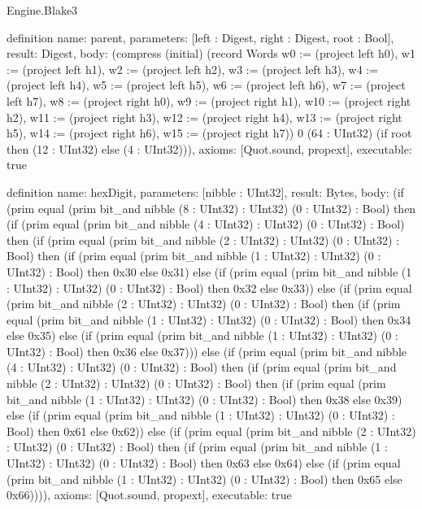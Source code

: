 \begin{lexlean}{Engine.Blake3}
\begin{semanticmodule}
definition{
  name: parent,
  parameters: [left : Digest, right : Digest, root : Bool],
  result: Digest,
  body: (compress (initial) (record Words {w0 := (project left h0), w1 := (project left h1), w2 := (project left h2), w3 := (project left h3), w4 := (project left h4), w5 := (project left h5), w6 := (project left h6), w7 := (project left h7), w8 := (project right h0), w9 := (project right h1), w10 := (project right h2), w11 := (project right h3), w12 := (project right h4), w13 := (project right h5), w14 := (project right h6), w15 := (project right h7)}) 0 (64 : UInt32) (if root then (12 : UInt32) else (4 : UInt32))),
  axioms: [Quot.sound, propext],
  executable: true
}

definition{
  name: hexDigit,
  parameters: [nibble : UInt32],
  result: Bytes,
  body: (if (prim equal (prim bit_and nibble (8 : UInt32) : UInt32) (0 : UInt32) : Bool) then (if (prim equal (prim bit_and nibble (4 : UInt32) : UInt32) (0 : UInt32) : Bool) then (if (prim equal (prim bit_and nibble (2 : UInt32) : UInt32) (0 : UInt32) : Bool) then (if (prim equal (prim bit_and nibble (1 : UInt32) : UInt32) (0 : UInt32) : Bool) then 0x30 else 0x31) else (if (prim equal (prim bit_and nibble (1 : UInt32) : UInt32) (0 : UInt32) : Bool) then 0x32 else 0x33)) else (if (prim equal (prim bit_and nibble (2 : UInt32) : UInt32) (0 : UInt32) : Bool) then (if (prim equal (prim bit_and nibble (1 : UInt32) : UInt32) (0 : UInt32) : Bool) then 0x34 else 0x35) else (if (prim equal (prim bit_and nibble (1 : UInt32) : UInt32) (0 : UInt32) : Bool) then 0x36 else 0x37))) else (if (prim equal (prim bit_and nibble (4 : UInt32) : UInt32) (0 : UInt32) : Bool) then (if (prim equal (prim bit_and nibble (2 : UInt32) : UInt32) (0 : UInt32) : Bool) then (if (prim equal (prim bit_and nibble (1 : UInt32) : UInt32) (0 : UInt32) : Bool) then 0x38 else 0x39) else (if (prim equal (prim bit_and nibble (1 : UInt32) : UInt32) (0 : UInt32) : Bool) then 0x61 else 0x62)) else (if (prim equal (prim bit_and nibble (2 : UInt32) : UInt32) (0 : UInt32) : Bool) then (if (prim equal (prim bit_and nibble (1 : UInt32) : UInt32) (0 : UInt32) : Bool) then 0x63 else 0x64) else (if (prim equal (prim bit_and nibble (1 : UInt32) : UInt32) (0 : UInt32) : Bool) then 0x65 else 0x66)))),
  axioms: [Quot.sound, propext],
  executable: true
}


\end{semanticmodule}
\end{lexlean}
